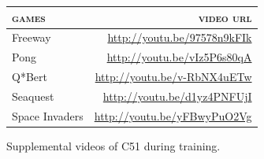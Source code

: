 \documentclass{article}
\begin{document}
\begin{figure}[htb]
\begin{tabular}{ l | r}
	\textbf{\textsc{games}}	&	\textbf{\textsc{video}} \textbf{\textsc{url}}\\
	\hline
	Freeway	& \url{http://youtu.be/97578n9kFIk} \\
	Pong		& \url{http://youtu.be/vIz5P6s80qA} \\
	Q*Bert	& \url{http://youtu.be/v-RbNX4uETw} \\
	Seaquest & \url{http://youtu.be/d1yz4PNFUjI} \\
	Space Invaders & \url{http://youtu.be/yFBwyPuO2Vg}
\end{tabular}
\caption{Supplemental videos of C51 during training.\label{fig:videos}}
\end{figure}

%

\newpage
\end{document}
